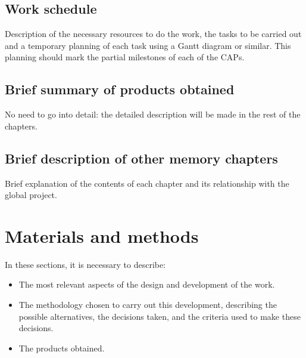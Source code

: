 \documentclass[ENG]{TFUOC}%
\begin{document}
\section{Work schedule}

Description of the necessary resources to do the work, the tasks to be carried out and a temporary planning of each task using a Gantt diagram or similar. This planning should mark the partial milestones of each of the CAPs.



\section{Brief summary of products obtained}

No need to go into detail: the detailed description will be made in the rest of the chapters.


\section{Brief description of other memory chapters}

Brief explanation of the contents of each chapter and its relationship with the global project.



\chapter{Materials and methods}
In these sections, it is necessary to describe:
\begin{itemize}
    \item The most relevant aspects of the design and development of the work.
    \item The methodology chosen to carry out this development, describing the possible alternatives, the decisions taken, and the criteria used to make these decisions.
    \item The products obtained.
\end{itemize}
\end{document}
